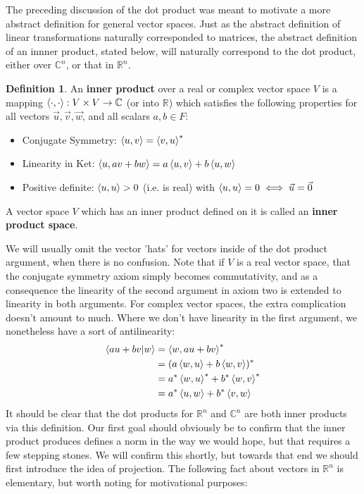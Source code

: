 \documentclass{article}
\theoremstyle{definition}
\newtheorem{definition}{Definition}[section]
\theoremstyle{plain}
\theoremstyle{theorem}
\begin{document}
\par The preceding discussion of the dot product was meant to motivate a more abstract definition for general vector spaces. Just as the abstract definition of linear transformations naturally corresponded to matrices, the abstract definition of an innner product, stated below, will naturally correspond to the dot product, either over $\mathbb{C}^n$, or that in $\mathbb{R}^n$.
\begin{definition}
		An \textbf{inner product} over a real or complex vector space $V$ is a mapping $\braket{\cdot,\cdot}: V \times V \to \mathbb{C}$ (or into $\mathbb{R}$) which satisfies the following properties for all vectors $\vec{u}, \vec{v}, \vec{w}$, and all scalars $a,b \in F$:
	\begin{itemize}
		\item Conjugate Symmetry: $\braket{u,v} = {\braket{v,u}}^*$
		\item Linearity in Ket: $\braket{u,av+bw} = a\braket{u,v}+b\braket{u,w}$
		\item Positive definite: $\braket{u,u} > 0$ (i.e. is real) with $\braket{u,u} = 0 \iff \vec{u} = \vec{0}$
	\end{itemize}
	A vector space $V$ which has an inner product defined on it is called an \textbf{inner product space}.
	\end{definition} 
	We will usually omit the vector 'hats' for vectors inside of the dot product argument, when there is no confusion. Note that if $V$ is a real vector space, that the conjugate symmetry axiom simply becomes commutativity, and as a consequence the linearity of the second argument in axiom two is extended to linearity in both arguments. For complex vector spaces, the extra complication doesn't amount to much. Where we don't have linearity in the first argument, we nonetheless have a sort of antilinearity:
	\begin{align}
		\braket{au+bv|w} &= \braket{w,au+bv}^* \\
						 &= (a\braket{w,u} + b\braket{w,v})^* \\
						 &= a^*\braket{w,u}^* + b^*\braket{w,v}^* \\
						 &= a^*\braket{u,w} + b^*\braket{v,w}
	\end{align}
It should be clear that the dot products for $\mathbb{R}^n$ and $\mathbb{C}^n$ are both inner products via this definition. Our first goal should obviously be to confirm that the inner product produces defines a norm in the way we would hope, but that requires a few stepping stones. We will confirm this shortly, but towards that end we should first introduce the idea of projection. The following fact about vectors in $\mathbb{R}^n$ is elementary, but worth noting for motivational purposes:
\end{document}
